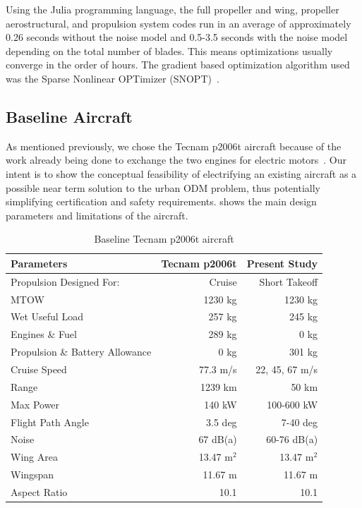\documentclass[conf]{new-aiaa}
\begin{document}
Using the Julia programming language, the full propeller and wing, propeller aerostructural, and propulsion system codes run in an average of approximately 0.26 seconds without the noise model and 0.5-3.5 seconds with the noise model depending on the total number of blades. This means optimizations usually converge in the order of hours. The gradient based optimization algorithm used was the Sparse Nonlinear OPTimizer (SNOPT)~\cite{snopt}.

\subsection{Baseline Aircraft}

\label{Short Haul Commuter}

As mentioned previously, we chose the Tecnam p2006t aircraft because of the work already being done to exchange the two engines for electric motors~\cite{Borer:2016aa}. Our intent is to show the conceptual feasibility of electrifying an existing aircraft as a possible near term solution to the urban ODM problem, thus potentially simplifying certification and safety requirements.  shows the main design parameters and limitations of the aircraft.

\setlength{\tabcolsep}{10pt}

\begin{table}[htbp]
    \begin{center}
        \caption{Baseline Tecnam p2006t aircraft{}}
        \label{tab:short_haul}
        \begin{tabular}{lrr} %
            \textbf{Parameters} & \textbf{Tecnam p2006t} & \textbf{Present Study} \\
            \midrule
            Propulsion Designed For: & Cruise & Short Takeoff   \\
            \midrule
            MTOW & 1230 kg  & 1230 kg   \\
            Wet Useful Load & 257 kg & 245 kg   \\
            Engines \& Fuel & 289 kg & 0 kg   \\
            Propulsion \& Battery Allowance & 0 kg & 301 kg   \\
            Cruise Speed & 77.3 m/s & 22, 45, 67 m/s  \\
            Range & 1239 km & 50 km  \\
            Max Power & 140 kW & 100-600 kW \\
            Flight Path Angle & 3.5 deg & 7-40 deg  \\
            Noise & 67 dB(a) & 60-76 dB(a)  \\
            Wing Area & 13.47 m$^2$  & 13.47 m$^2$   \\
            Wingspan & 11.67 m & 11.67 m  \\
            Aspect Ratio & 10.1 & 10.1  \\

        \end{tabular}
    \end{center}

\end{table}
\end{document}
